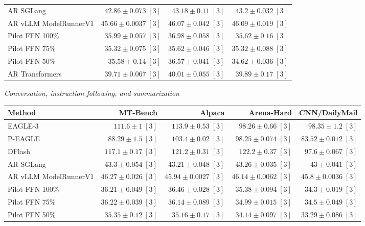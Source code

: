 \documentclass[conference,onecolumn]{IEEEtran}
\begin{document}
\begin{table}[!htp]
\begin{tabular}{@{}>{\raggedright\arraybackslash}p{3.7cm}rrr@{}}
AR \textperiodcentered{} SGLang & \(42.86 \pm 0.073\;[3]\) & \(43.18 \pm 0.11\;[3]\) & \(43.2 \pm 0.032\;[3]\) \\
AR \textperiodcentered{} vLLM ModelRunnerV1 & \(45.66 \pm 0.0037\;[3]\) & \(46.07 \pm 0.042\;[3]\) & \(46.09 \pm 0.019\;[3]\) \\
Pilot FFN 100\% & \(35.99 \pm 0.057\;[3]\) & \(36.98 \pm 0.058\;[3]\) & \(35.62 \pm 0.16\;[3]\) \\
Pilot FFN 75\% & \(35.32 \pm 0.075\;[3]\) & \(35.62 \pm 0.046\;[3]\) & \(35.32 \pm 0.088\;[3]\) \\
Pilot FFN 50\% & \(35.58 \pm 0.14\;[3]\) & \(36.57 \pm 0.041\;[3]\) & \(34.62 \pm 0.036\;[3]\) \\
AR \textperiodcentered{} Transformers & \(39.71 \pm 0.067\;[3]\) & \(40.01 \pm 0.055\;[3]\) & \(39.89 \pm 0.17\;[3]\) \\
\bottomrule
\end{tabular}\par\medskip
\textit{Conversation, instruction following, and summarization}\par\smallskip
\begin{tabular}{@{}>{\raggedright\arraybackslash}p{3.7cm}rrrr@{}}
\toprule
Method & MT-Bench & Alpaca & Arena-Hard & CNN/DailyMail \\
\midrule
EAGLE-3 & \(111.6 \pm 1\;[3]\) & \(113.9 \pm 0.53\;[3]\) & \(98.26 \pm 0.66\;[3]\) & \(\mathbf{98.35} \pm 1.2\;[3]\) \\
P-EAGLE & \(88.29 \pm 1.5\;[3]\) & \(103.4 \pm 0.02\;[3]\) & \(98.25 \pm 0.074\;[3]\) & \(83.52 \pm 0.012\;[3]\) \\
DFlash & \(\mathbf{117.1} \pm 0.17\;[3]\) & \(\mathbf{121.2} \pm 0.31\;[3]\) & \(\mathbf{122.2} \pm 0.37\;[3]\) & \(97.6 \pm 0.067\;[3]\) \\
AR \textperiodcentered{} SGLang & \(43.3 \pm 0.054\;[3]\) & \(43.21 \pm 0.048\;[3]\) & \(43.26 \pm 0.035\;[3]\) & \(43 \pm 0.041\;[3]\) \\
AR \textperiodcentered{} vLLM ModelRunnerV1 & \(46.27 \pm 0.026\;[3]\) & \(45.94 \pm 0.0027\;[3]\) & \(46.14 \pm 0.0062\;[3]\) & \(45.8 \pm 0.0036\;[3]\) \\
Pilot FFN 100\% & \(36.21 \pm 0.049\;[3]\) & \(36.46 \pm 0.028\;[3]\) & \(35.38 \pm 0.094\;[3]\) & \(34.3 \pm 0.019\;[3]\) \\
Pilot FFN 75\% & \(36.22 \pm 0.039\;[3]\) & \(36.14 \pm 0.089\;[3]\) & \(34.99 \pm 0.015\;[3]\) & \(34.5 \pm 0.049\;[3]\) \\
Pilot FFN 50\% & \(35.35 \pm 0.12\;[3]\) & \(35.16 \pm 0.17\;[3]\) & \(34.14 \pm 0.097\;[3]\) & \(33.29 \pm 0.086\;[3]\) \\

\end{tabular}
\end{table}
\end{document}
